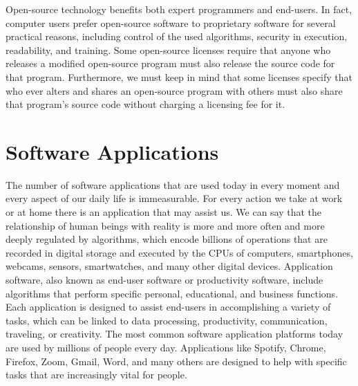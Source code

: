Open-source technology benefits both expert programmers and end-users. In fact, computer users prefer open-source software to proprietary software for several practical reasons, including control of the used algorithms, security in execution, readability, and training. Some open-source licenses require that anyone who releases a modified open-source program must also release the source code for that program. Furthermore, we must keep in mind that some licenses specify that who ever alters and shares an open-source program with others must also share that program's source code without charging a licensing fee for it.


\section{\label{sec:2.7}Software Applications}

The number of software applications that are used today in every moment and every aspect of our daily life is immeasurable. For every action we take at work or at home there is an application that may assist us. We can say that the relationship of human beings with reality is more and more often and more deeply regulated by algorithms, which encode billions of operations that are recorded in digital storage and executed by the CPUs of computers, smartphones, webcams, sensors, smartwatches, and many other digital devices. Application software, also known as end-user software or productivity software, include algorithms that perform specific personal, educational, and business functions. Each application is designed to assist end-users in accomplishing a variety of tasks, which can be linked to data processing, productivity, communication, traveling, or creativity. The most common software application platforms today are used by millions of people every day. Applications like Spotify, Chrome, Firefox, Zoom, Gmail, Word, and many others are designed to help with specific tasks that are increasingly vital for people.

